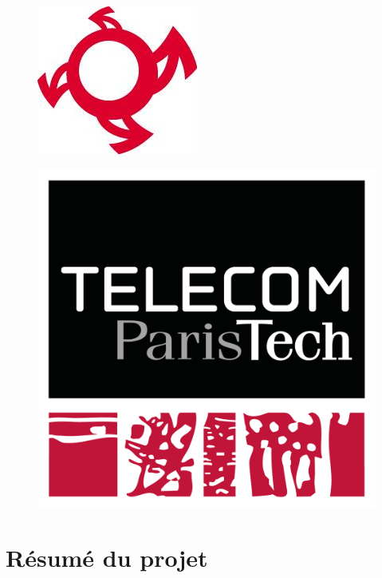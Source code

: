 \documentclass[a4paper,10pt]{report}
\theoremstyle{remark}
\begin{document}
\begin{titlepage}
	\begin{figure}[htp]
	\centering
	\includegraphics[scale=0.60]{./images/logoPACT.jpg}
	\end{figure}

	\begin{figure}[htp]
	\centering
	\includegraphics[scale=0.12]{./images/logoTelecom.png}
	\end{figure}

\end{titlepage}


\newpage

\tableofcontents

\newpage


\chapter{Résumé du projet}
	
\end{document}
